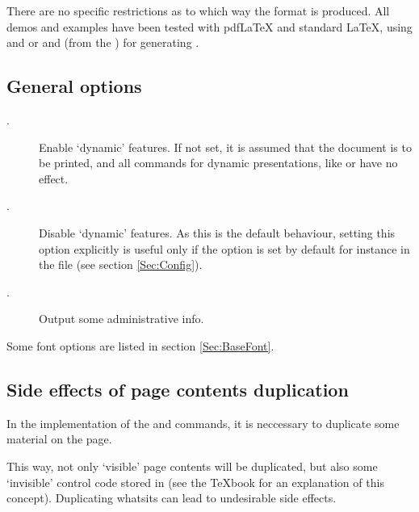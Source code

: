 \begin{slide}
There are no specific restrictions as to which way the  format is produced. All demos and examples
have been tested with pdf\LaTeX{} and standard \LaTeX, using
 and \href{http://www.adobe.com/products/acrobat/}%
{}
or  and  (from the \href{http://www.ghostscript.com/}%
{}) for generating .

\newslide

\subsection{General options}\label{Sec:GenOpt}
\begin{description}
\item[.] Enable `dynamic' features. If not set, it is assumed that the document is to be
  printed, and all commands for dynamic presentations, like  or  have no effect.

\item[.] Disable `dynamic' features. As this is the default behaviour,
  setting this option explicitly is useful only if the option  is set by default for instance in the
   file (see section \ref{Sec:Config}).

\item[.] Output some administrative info.
\end{description}
Some font options are listed in section \ref{Sec:BaseFont}.

\newslide

\subsection{Side effects of page contents duplication}\label{Sec:Dupl}
In the implementation of the  and  commands, it is neccessary to duplicate some
material on the page.

This way, not only `visible' page contents will be duplicated, but also some `invisible' control code stored in
 (see the \TeX book for an explanation of this concept). Duplicating whatsits can lead to undesirable
side effects.


\end{slide}
